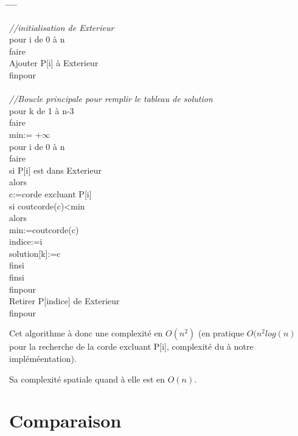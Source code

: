\documentclass[a4paper,10pt]{article}
\begin{document}
\begin{tabbing}
\hspace{0.5cm} \= \hspace{0.5cm}  \= \hspace{0.5cm} \= \hspace{0.5cm} \= \kill


\textit{//initialisation de Exterieur}\\
pour i de 0 à n\\
faire\\
\> Ajouter P[i] à Exterieur\\
finpour\\
\\
\textit{//Boucle principale pour remplir le tableau de solution}\\
pour k de 1 à n-3\\
faire\\
    \> min:= $+\infty$ \\ 
    \> pour i de 0 à n\\
    \> faire\\
        \> \> si P[i] est dans Exterieur\\
        \> \> alors\\
            \> \> \> c:=corde excluant P[i]\\
            \> \> \> si coutcorde(c)<min\\
            \> \> \> alors\\
                \> \> \> \> min:=coutcorde(c)\\
                \> \> \> \> indice:=i\\
                \> \> \> \> solution[k]:=c\\
            \> \> \> finsi\\
        \> \> finsi\\
    \> finpour\\
    \> Retirer P[indice] de Exterieur\\
finpour\\
\end{tabbing}
 

Cet algorithme à donc une complexité en $O(n^2)$ (en pratique $O(n^2log(n)$ pour la recherche de la corde excluant P[i], complexité du à notre impléméentation).

Sa complexité spatiale quand à elle est en $O(n)$.

\section{Comparaison}
\end{document}
